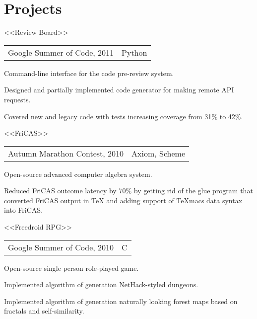 \documentclass[a4paper]{article}
\begin{document}

	\section{Projects}
	\begin{multicols}{2}
		\raggedcolumns
		\begin{project}{<<Review Board>>}{\begin{tabular}{@{}l|l}Google Summer of Code, 2011 & Python\\\end{tabular}}
			Command-line interface for the code pre-review system.
			\begin{items}
				\item Designed and partially implemented code generator for making remote API requests.
				\item Covered new and legacy code with tests increasing coverage from 31$\%$ to 42$\%$.
			\end{items}
		\end{project}

		\begin{project}{<<FriCAS>>}{\begin{tabular}{@{}l|l}Autumn Marathon Contest, 2010 & Axiom, Scheme\\\end{tabular}}
			Open-source advanced computer algebra system.
			\begin{items}
				\item Reduced FriCAS outcome latency by 70$\%$ by getting rid of the glue program that converted FriCAS output in \TeX{} and adding support of TeXmacs data syntax into FriCAS.
			\end{items}
		\end{project}

		\columnbreak

		\begin{project}{<<Freedroid RPG>>}{\begin{tabular}{@{}l|l}Google Summer of Code, 2010 & C\\\end{tabular}}
			Open-source single person role-played game.
			\begin{items}
				\item Implemented algorithm of generation NetHack-styled dungeons.
				\item Implemented algorithm of generation naturally looking forest maps based on fractals and self-similarity.
			\end{items}
		\end{project}


\end{multicols}
\end{document}
